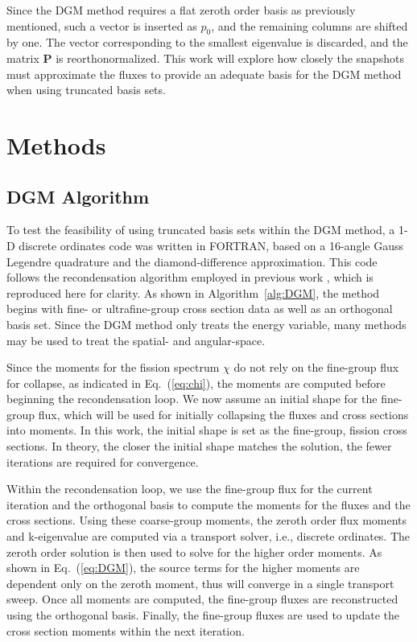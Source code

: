\documentclass[5p,times,twocolumn,10pt]{elsarticle}
\newcommand{\EQ}[1]{Eq.~(\ref{#1})}               %
\newcommand{\mat}[1]{\ensuremath{\bm{#1}}}
\begin{document}
    Since the DGM method requires a flat zeroth order basis as previously mentioned, such a vector is inserted as $p_0$, and the remaining columns are shifted by one.
    The vector corresponding to the smallest eigenvalue is discarded, and the matrix $\mat{P}$ is reorthonormalized.
    This work will explore how closely the snapshots must approximate the fluxes to provide an adequate basis for the DGM method when using truncated basis sets.

    \section{Methods}
    \subsection{DGM Algorithm}
    To test the feasibility of using truncated basis sets within the DGM method, a 1-D discrete ordinates code was written in FORTRAN, based on a 16-angle Gauss Legendre quadrature and the diamond-difference approximation.
    This code follows the recondensation algorithm employed in previous work \cite{gibson_resonance_2013}, which is reproduced here for clarity.
    As shown in Algorithm~\ref{alg:DGM}, the method begins with fine- or ultrafine-group cross section data as well as an orthogonal basis set.
    Since the DGM method only treats the energy variable, many methods may be used to treat the spatial- and angular-space.

    Since the moments for the fission spectrum $\chi$ do not rely on the fine-group flux for collapse, as indicated in \EQ{eq:chi}, the moments are computed before beginning the recondensation loop.
    We now assume an initial shape for the fine-group flux, which will be used for initially collapsing the fluxes and cross sections into moments.
    In this work, the initial shape is set as the fine-group, fission cross sections.
    In theory, the closer the initial shape matches the solution, the fewer iterations are required for convergence.

    Within the recondensation loop, we use the fine-group flux for the current iteration and the orthogonal basis to compute the moments for the fluxes and the cross sections.
    Using these coarse-group moments, the zeroth order flux moments and k-eigenvalue are computed via a transport solver, i.e., discrete ordinates.
    The zeroth order solution is then used to solve for the higher order moments.
    As shown in \EQ{eq:DGM}, the source terms for the higher moments are dependent only on the zeroth moment, thus will converge in a single transport sweep.
    Once all moments are computed, the fine-group fluxes are reconstructed using the orthogonal basis.
    Finally, the fine-group fluxes are used to update the cross section moments within the next iteration.
\end{document}
